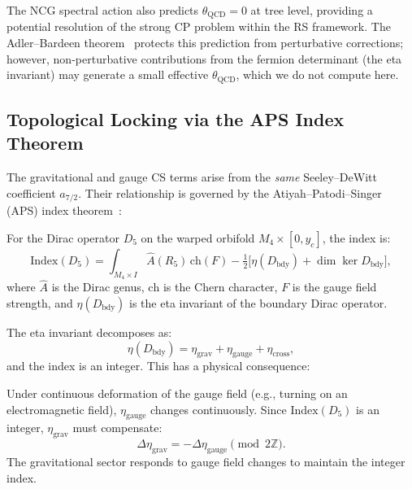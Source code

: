 \begin{remark}
The NCG spectral action also predicts $\theta_{\mathrm{QCD}} = 0$ at tree level, providing a potential resolution of the strong CP problem within the RS framework. The Adler--Bardeen theorem~\cite{ch4:AdlerBardeen1969} protects this prediction from perturbative corrections; however, non-perturbative contributions from the fermion determinant (the eta invariant) may generate a small effective $\theta_{\mathrm{QCD}}$, which we do not compute here.
\end{remark}


\subsection{Topological Locking via the APS Index Theorem}
\label{sec:4-aps}

The gravitational and gauge CS terms arise from the \emph{same} Seeley--DeWitt coefficient $a_{7/2}$. Their relationship is governed by the Atiyah--Patodi--Singer (APS) index theorem~\cite{ch4:APS1975a}:

\begin{theorem}\label{thm:4-2}
For the Dirac operator $D_5$ on the warped orbifold $M_4 \times [0, y_c]$, the index is:
\begin{equation}
  \mathrm{Index}(D_5) = \int_{M_4 \times I} \hat{A}(R_5)\, \mathrm{ch}(F)
                      - \tfrac{1}{2}\bigl[\eta(D_{\mathrm{bdy}}) + \dim\ker D_{\mathrm{bdy}}\bigr],
  \label{eq:4-46}
\end{equation}
where $\hat{A}$ is the Dirac genus, $\mathrm{ch}$ is the Chern character, $F$ is the gauge field strength, and $\eta(D_{\mathrm{bdy}})$ is the eta invariant of the boundary Dirac operator.
\end{theorem}

The eta invariant decomposes as:
\begin{equation}
  \eta(D_{\mathrm{bdy}}) = \eta_{\mathrm{grav}} + \eta_{\mathrm{gauge}} + \eta_{\mathrm{cross}},
  \label{eq:4-47}
\end{equation}
and the index is an integer. This has a physical consequence:

\begin{corollary}\label{cor:4-locking}
Under continuous deformation of the gauge field (e.g., turning on an electromagnetic field), $\eta_{\mathrm{gauge}}$ changes continuously. Since $\mathrm{Index}(D_5)$ is an integer, $\eta_{\mathrm{grav}}$ must compensate:
\begin{equation}
  \Delta \eta_{\mathrm{grav}} = -\Delta \eta_{\mathrm{gauge}} \pmod{2\mathbb{Z}}.
  \label{eq:4-48}
\end{equation}
The gravitational sector responds to gauge field changes to maintain the integer index.
\end{corollary}

